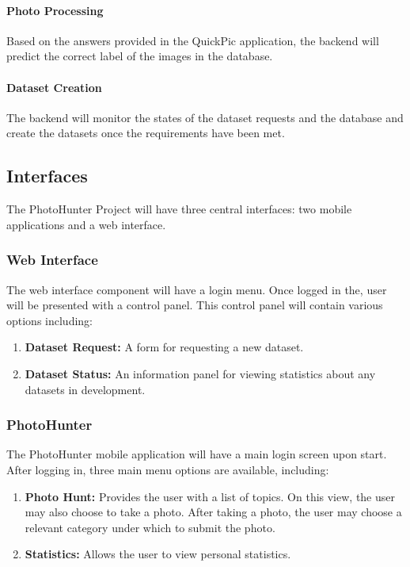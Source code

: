\documentclass{article}
\begin{document}
  \paragraph{Photo Processing}
  Based on the answers provided in the QuickPic application, the backend will
  predict the correct label of the images in the database.

  \paragraph{Dataset Creation}
  The backend will monitor the states of the dataset requests and the database
  and create the datasets once the requirements have been met.

\subsection{Interfaces}
The PhotoHunter Project will have three central interfaces: two mobile
applications and a web interface.

\subsubsection{Web Interface}
The web interface component will have a login menu. Once logged in the, user
will be presented with a control panel. This control panel will contain various
options including:

\begin{enumerate}

  \item \textbf{Dataset Request:} A form for requesting a new dataset.

  \item \textbf{Dataset Status:} An information panel for viewing statistics
        about any datasets in development.

\end{enumerate}

\subsubsection{PhotoHunter}
The PhotoHunter mobile application will have a main login screen upon start.
After logging in, three main menu options are available, including:

\begin{enumerate}

  \item \textbf{Photo Hunt:} Provides the user with a list of topics. On this
        view, the user may also choose to take a photo. After taking a photo, the user
        may choose a relevant category under which to submit the photo.

  \item \textbf{Statistics:} Allows the user to view personal statistics.

\end{enumerate}
\end{document}
